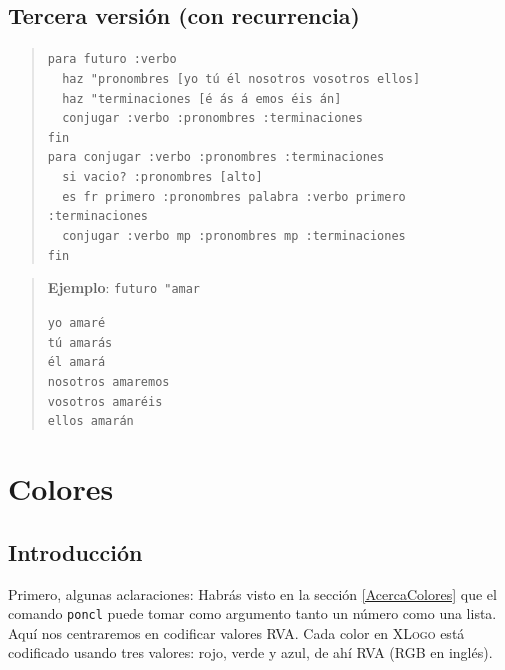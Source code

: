 \subsection{Tercera versi\'on (con recurrencia)}

\begin{quote}
   \verb+para futuro :verbo +\\
   \verb+  haz "pronombres [yo +\texttt{t\'u \'el nosotros vosotros ellos]}\\
   \verb+  haz "terminaciones [+\texttt{\'e \'as \'a emos \'eis \'an]}\\
   \verb+  conjugar :verbo :pronombres :terminaciones+\\
   \verb+fin+\\

   \verb+para conjugar :verbo :pronombres :terminaciones+\\
   \verb+  si vacio? :pronombres [alto]+\\
   \verb+  es fr primero :pronombres palabra :verbo primero :terminaciones+\\
   \verb+  conjugar :verbo mp :pronombres mp :terminaciones+\\
   \verb+fin+ \end{quote}
\begin{quote}
   \noindent \textbf{Ejemplo}: \verb+futuro "amar+

   \texttt{yo amar\'e}\\
   \texttt{t\'u amar\'as}\\
   \texttt{\'el amar\'a}\\
   \texttt{nosotros amaremos}\\
   \texttt{vosotros amar\'eis}\\
   \texttt{ellos amar\'an}
\end{quote}

\section{Colores}
   \label{EjColores}

\subsection{Introducci\'on}
   \label{Colores-Introduccion}

Primero, algunas aclaraciones: Habr\'as visto en la secci\'on
\ref{AcercaColores} que el comando \texttt{poncl} puede tomar como
argumento tanto un n\'umero como una lista. Aqu\'i nos
centraremos en codificar valores RVA. Cada color en \textsc{XLogo}
est\'a codificado usando tres valores: rojo, verde y azul, de ah\'i RVA
(RGB en ingl\'es). 

